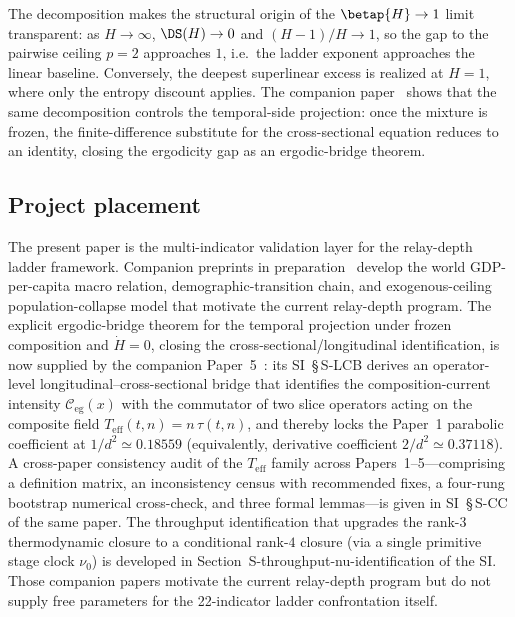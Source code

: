 The decomposition makes the structural origin of the $\betap{H}\to 1$ limit
transparent: as $H\to\infty$, $\DS(H)\to 0$ and $(H-1)/H\to 1$, so the gap
to the pairwise ceiling $p=2$ approaches $1$, i.e.\ the ladder exponent
approaches the linear baseline.  Conversely, the deepest superlinear excess
is realized at $H=1$, where only the entropy discount applies.  The companion
paper~\cite{Kato2026c} shows that the same decomposition controls the
temporal-side projection: once the mixture is frozen, the finite-difference
substitute for the cross-sectional equation reduces to an identity, closing
the ergodicity gap as an ergodic-bridge theorem.

\subsection{Project placement}

The present paper is the multi-indicator validation layer for the
relay-depth ladder framework. Companion preprints in preparation~\cite{Kato2026a,Kato2026b,Kato2026c}
develop the world GDP-per-capita macro relation, demographic-transition
chain, and exogenous-ceiling population-collapse model that motivate the
current relay-depth program.
The explicit ergodic-bridge theorem for the temporal projection under frozen
composition and $\dot H = 0$, closing the cross-sectional/longitudinal
identification, is now supplied by the companion Paper~5~\cite{Kato2026e}:
its SI~\S\,S-LCB derives an operator-level longitudinal--cross-sectional
bridge that identifies the composition-current intensity
$\mathcal{C}_{\mathrm{eg}}(x)$ with the commutator of two slice operators
acting on the composite field $T_{\mathrm{eff}}(t,n)=n\,\tau(t,n)$, and
thereby locks the Paper~1 parabolic coefficient at $1/d^{2}\simeq 0.18559$ (equivalently, derivative coefficient $2/d^{2}\simeq 0.37118$). A
cross-paper consistency audit of the $T_{\mathrm{eff}}$ family across
Papers~1--5---comprising a definition matrix, an inconsistency census with
recommended fixes, a four-rung bootstrap numerical cross-check, and three
formal lemmas---is given in SI~\S\,S-CC of the same paper.
The throughput identification that upgrades the rank-$3$ thermodynamic closure
to a conditional rank-$4$ closure (via a single primitive stage clock
$\nu_0$) is developed in Section~\textsf{S-throughput-nu-identification} of the
SI.
Those companion papers motivate the current relay-depth program but do not
supply free parameters for the 22-indicator ladder confrontation itself.

